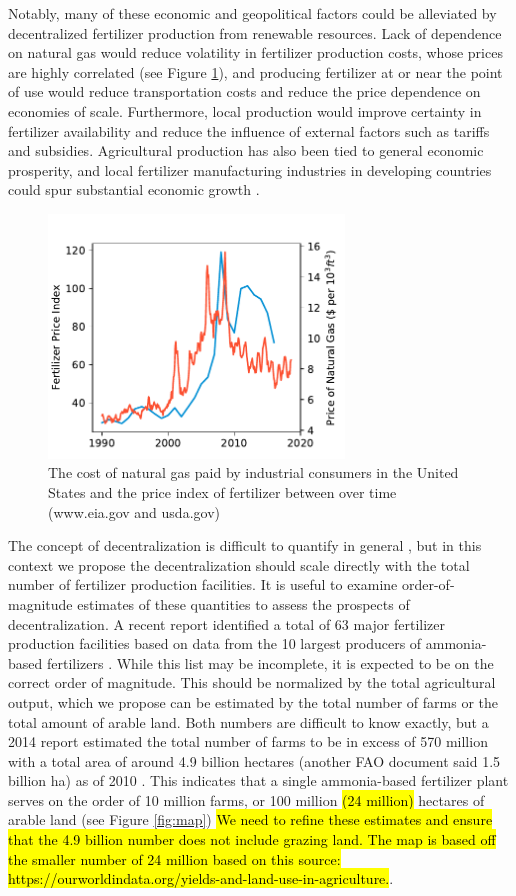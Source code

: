 Notably, many of these economic and geopolitical factors could be alleviated by decentralized fertilizer production from renewable resources. Lack of dependence on natural gas would reduce volatility in fertilizer production costs, whose prices are highly correlated (see Figure \ref{fig:gas_vs_fert}), and producing fertilizer at or near the point of use would reduce transportation costs and reduce the price dependence on economies of scale. Furthermore, local production would improve certainty in fertilizer availability and reduce the influence of external factors such as tariffs and subsidies. Agricultural production has also been tied to general economic prosperity, and local fertilizer manufacturing industries in developing countries could spur substantial economic growth \cite{McArthur_2017}.
\begin{figure}
    \centering
    \includegraphics[width=0.7\textwidth]{Figures/gas_vs_fert.pdf}
    \caption{The cost of natural gas paid by industrial consumers in the United States and the price index of fertilizer between over time (www.eia.gov and usda.gov)}
    \label{fig:gas_vs_fert}
\end{figure}
The concept of decentralization is difficult to quantify in general \cite{Schneider_2003}, but in this context we propose the decentralization should scale directly with the total number of fertilizer production facilities. It is useful to examine order-of-magnitude estimates of these quantities to assess the prospects of decentralization. A recent report identified a total of 63 major fertilizer production facilities based on data from the 10 largest producers of ammonia-based fertilizers \cite{McArthur_2017}. While this list may be incomplete, it is expected to be on the correct order of magnitude. This should be normalized by the total agricultural output, which we propose can be estimated by the total number of farms or the total amount of arable land. Both numbers are difficult to know exactly, but a 2014 report estimated the total number of farms to be in excess of 570 million with a total area of around 4.9 billion hectares (another FAO document said 1.5 billion ha) as of 2010 \cite{FAO_2014,Lowder_2016}. This indicates that a single ammonia-based fertilizer plant serves on the order of 10 million farms, or 100 million \hl{(24 million)} hectares of arable land (see Figure \ref{fig:map}) \hl{We need to refine these estimates and ensure that the 4.9 billion number does not include grazing land. The map is based off the smaller number of 24 million based on this source: https://ourworldindata.org/yields-and-land-use-in-agriculture.}.
